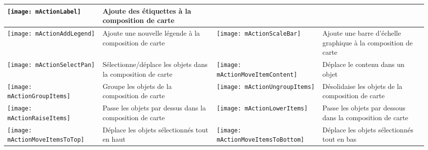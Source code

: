 \begin{table}[h]
\begin{tabular}{|l|p{6.9cm}|l|p{6.9cm}|}
\texttt{[image: mActionLabel]} & Ajoute des \'etiquettes \`a la
composition de carte \\
\hline \texttt{[image: mActionAddLegend]} & Ajoute une nouvelle 
l\'egende \`a la composition de carte &
 \texttt{[image: mActionScaleBar]} & Ajoute une barre
d'\'echelle graphique \`a la composition de carte\\
\hline \texttt{[image: mActionSelectPan]} & S\'electionne/d\'eplace les
objets dans la composition de carte &
\texttt{[image: mActionMoveItemContent]} & D\'eplace le contenu dans
un objet \\
 \hline \texttt{[image: mActionGroupItems]} & Groupe les objets de
la composition de carte & 
 \texttt{[image: mActionUngroupItems]} & D\'esolidaise les objets de
la composition de carte \\
 \hline \texttt{[image: mActionRaiseItems]} & Passe les objets par
dessus dans la composition de carte &
\texttt{[image: mActionLowerItems]} & Passe les objets par dessous
dans la composition de carte \\
 \hline \texttt{[image: mActionMoveItemsToTop]} & D\'eplace les
objets s\'electionn\'es tout en haut & 
 \texttt{[image: mActionMoveItemsToBottom]} & D\'eplace les
objets s\'electionn\'es tout en bas \\
\hline
\end{tabular}
\end{table}

